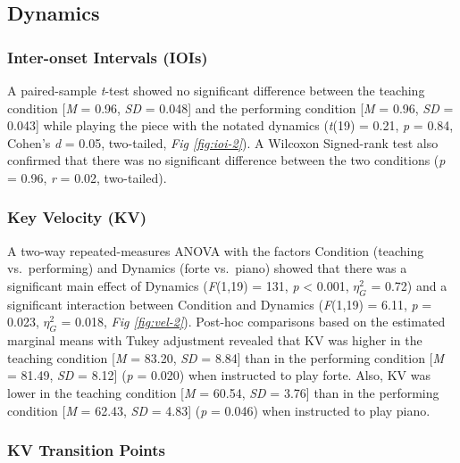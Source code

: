 \documentclass[
  man,floatsintext]{apa6}
\begin{document}
\hypertarget{dynamics-1}{%
\subsection{Dynamics}\label{dynamics-1}}

\hypertarget{inter-onset-intervals-iois-3}{%
\subsubsection{Inter-onset Intervals (IOIs)}\label{inter-onset-intervals-iois-3}}

A paired-sample \emph{t}-test showed no significant difference between the teaching condition {[}\emph{M} = 0.96, \emph{SD} = 0.048{]} and the performing condition {[}\emph{M} = 0.96, \emph{SD} = 0.043{]} while playing the piece with the notated dynamics (\emph{t}(19) = 0.21, \emph{p} = 0.84, Cohen's \emph{d} = 0.05, two-tailed, \emph{Fig \ref{fig:ioi-2}}). A Wilcoxon Signed-rank test also confirmed that there was no significant difference between the two conditions (\emph{p} = 0.96, \emph{r} = 0.02, two-tailed).

\hypertarget{key-velocity-kv-3}{%
\subsubsection{Key Velocity (KV)}\label{key-velocity-kv-3}}

A two-way repeated-measures ANOVA with the factors Condition (teaching vs.~performing) and Dynamics (forte vs.~piano) showed that there was a significant main effect of Dynamics (\emph{F}(1,19) = 131, \emph{p} \textless{} 0.001, \(\eta_G^2\) = 0.72) and a significant interaction between Condition and Dynamics (\emph{F}(1,19) = 6.11, \emph{p} = 0.023, \(\eta_G^2\) = 0.018, \emph{Fig \ref{fig:vel-2}}). Post-hoc comparisons based on the estimated marginal means with Tukey adjustment revealed that KV was higher in the teaching condition {[}\emph{M} = 83.20, \emph{SD} = 8.84{]} than in the performing condition {[}\emph{M} = 81.49, \emph{SD} = 8.12{]} (\emph{p} = 0.020) when instructed to play forte. Also, KV was lower in the teaching condition {[}\emph{M} = 60.54, \emph{SD} = 3.76{]} than in the performing condition {[}\emph{M} = 62.43, \emph{SD} = 4.83{]} (\emph{p} = 0.046) when instructed to play piano.

\hypertarget{kv-transition-points-1}{%
\subsubsection{KV Transition Points}\label{kv-transition-points-1}}
\end{document}
